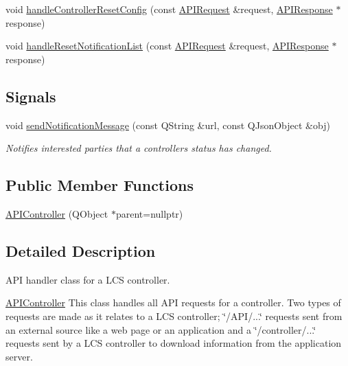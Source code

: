 \begin{DoxyCompactItemize}
\item 
void \hyperlink{class_a_p_i_controller_a0d4deeaff703bb7d60eb344e6ee9f8cb}{handle\+Controller\+Reset\+Config} (const \hyperlink{class_a_p_i_request}{A\+P\+I\+Request} \&request, \hyperlink{class_a_p_i_response}{A\+P\+I\+Response} $\ast$response)
\item 
void \hyperlink{class_a_p_i_controller_a9b2f08f4b0a67c0a4f6891a9d8601b93}{handle\+Reset\+Notification\+List} (const \hyperlink{class_a_p_i_request}{A\+P\+I\+Request} \&request, \hyperlink{class_a_p_i_response}{A\+P\+I\+Response} $\ast$response)
\end{DoxyCompactItemize}
\subsection*{Signals}
\begin{DoxyCompactItemize}
\item 
\mbox{\label{class_a_p_i_controller_aa31deccd23ec06a6dc92b449b0bc86f8}} 
void \hyperlink{class_a_p_i_controller_aa31deccd23ec06a6dc92b449b0bc86f8}{send\+Notification\+Message} (const Q\+String \&url, const Q\+Json\+Object \&obj)
\begin{DoxyCompactList}\small\item\em Notifies interested parties that a controller\textquotesingle{}s status has changed. \end{DoxyCompactList}\end{DoxyCompactItemize}
\subsection*{Public Member Functions}
\begin{DoxyCompactItemize}
\item 
\hyperlink{class_a_p_i_controller_a779b634bce4b7fcbec9fca8f5f8f63e6}{A\+P\+I\+Controller} (Q\+Object $\ast$parent=nullptr)
\end{DoxyCompactItemize}


\subsection{Detailed Description}
A\+PI handler class for a L\+CS controller. 

\hyperlink{class_a_p_i_controller}{A\+P\+I\+Controller} This class handles all A\+PI requests for a controller. Two types of requests are made as it relates to a L\+CS controller; \char`\"{}/\+A\+P\+I/...\char`\"{} requests sent from an external source like a web page or an application and a \char`\"{}/controller/...\char`\"{} requests sent by a L\+CS controller to download information from the application server. 

